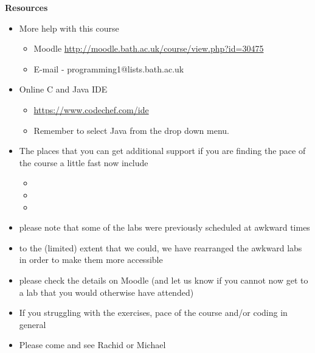 \documentclass{beamer}
\begin{document}
\begin{frame} 
\begin{center}
\textbf{Resources}
\end{center}
\begin{itemize}
\item More help with this course
\begin{itemize}
\item Moodle \url{http://moodle.bath.ac.uk/course/view.php?id=30475}
\item E-mail - programming1@lists.bath.ac.uk
\end{itemize}
\item Online C \alert{and Java} IDE
\begin{itemize}
\item \url{https://www.codechef.com/ide}
\item Remember to select Java from the drop down menu.
\end{itemize}
\end{itemize}
\end{frame}

\begin{frame} 
\begin{itemize}
\item The places that you can get additional support if you are finding the pace of the course a little fast now include
\begin{itemize}
\item {}
\item {}
\item {}
\end{itemize}
\item please note that some of the labs were previously scheduled at awkward times
\item to the (limited) extent that we could, we have rearranged the awkward labs in order to make them more accessible
\item please check the details on Moodle (and let us know if you cannot now get to a lab that you would otherwise have attended)
\end{itemize}
\end{frame}

\begin{frame}
\begin{itemize}
\item If you struggling with the exercises, pace of the course and/or coding in general
\item Please come and see Rachid or Michael
\end{itemize}
\end{frame}
 
\end{document}
